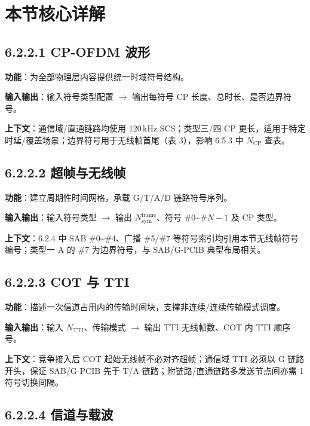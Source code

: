\documentclass[11pt,a4paper]{ctexart}
\begin{document}
\section{本节核心详解}

\subsection{6.2.2.1 CP-OFDM 波形}

\textbf{功能}：为全部物理层内容提供统一时域符号结构。

\textbf{输入输出}：输入符号类型配置 $\rightarrow$ 输出每符号 CP 长度、总时长、是否边界符号。

\textbf{上下文}：通信域/直通链路均使用 120\,kHz SCS；类型三/四 CP 更长，适用于特定时延/覆盖场景；边界符号用于无线帧首尾（表 3），影响 6.5.3 中 $N_{\mathrm{CP}}$ 查表。

\subsection{6.2.2.2 超帧与无线帧}

\textbf{功能}：建立周期性时间网格，承载 G/T/A/D 链路符号序列。

\textbf{输入输出}：输入符号类型 $\rightarrow$ 输出 $N_{\mathrm{sym}}^{\mathrm{frame}}$、符号 \#0\textasciitilde\#$N{-}1$ 及 CP 类型。

\textbf{上下文}：6.2.4 中 SAB \#0\textasciitilde\#4、广播 \#5/\#7 等符号索引均引用本节无线帧符号编号；类型一 A 的 \#7 为边界符号，与 SAB/G-PCIB 典型布局相关。

\subsection{6.2.2.3 COT 与 TTI}

\textbf{功能}：描述一次信道占用内的传输时间块，支撑非连续/连续传输模式调度。

\textbf{输入输出}：输入 $N_{\mathrm{TTI}}$、传输模式 $\rightarrow$ 输出 TTI 无线帧数、COT 内 TTI 顺序号。

\textbf{上下文}：竞争接入后 COT 起始无线帧不必对齐超帧；通信域 TTI 必须以 G 链路开头，保证 SAB/G-PCIB 先于 T/A 链路；附链路/直通链路多发送节点间亦需 1 符号切换间隔。

\subsection{6.2.2.4 信道与载波}
\end{document}
